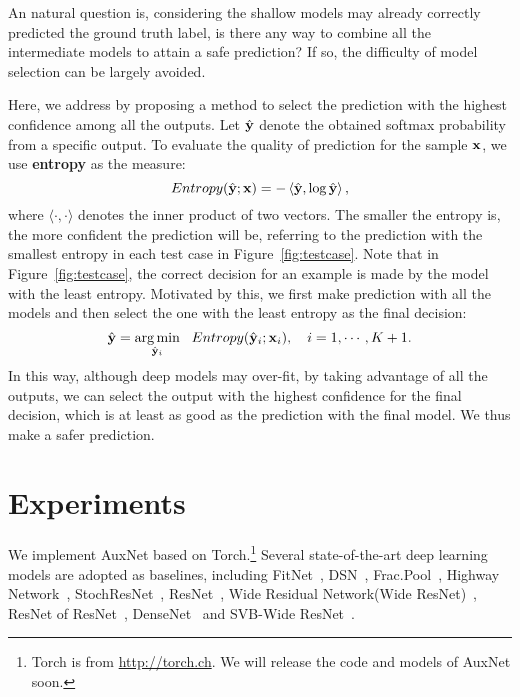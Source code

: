 \documentclass[10pt,onecolumn,letterpaper]{article}
\def\bx{{\bf x}}
\def\by{{\bf y}}
\def\SexyName{AuxNet\xspace}
\begin{document}
An natural question is, considering the shallow models may already correctly predicted the ground truth label, is there any way to combine all the intermediate models to attain a safe prediction? If so, the difficulty of model selection can be largely avoided.


Here, we address by proposing a method to select the prediction with the highest confidence among all the outputs.
Let $\hat{\by}$ denote the obtained softmax probability from a specific output.  To evaluate the quality of prediction for the sample $\bx$, we use \textbf{entropy} as the measure:
\begin{equation}
Entropy({\hat \by}; \bx) =  - \left\langle {\hat \by,\log \hat \by} \right\rangle ,
\end{equation}
where $\langle \cdot, \cdot\rangle$ denotes the inner product of two vectors. The smaller the entropy is, the more confident the prediction will be, referring to the prediction with the smallest entropy in each test case in Figure~\ref{fig:testcase}. Note that in Figure~\ref{fig:testcase}, the correct decision for an example is made by the model with the least entropy. Motivated by this, we first make prediction with all the models and then select the one with the least entropy as the final decision:
\begin{equation}
\hat \by = \mathop {\arg \min }\limits_{{\hat \by_i}} ~~Entropy({\hat \by_i};{\bx_i}), ~~~ i=1, \cdots, K+1.
\end{equation}
In this way, although deep models may over-fit, by taking advantage of all the outputs, we can select the output with the highest confidence for the final decision, which is at least as good as the prediction with the final model. We thus make a safer prediction.


\section{Experiments}\label{sec:exp}
We implement \SexyName based on Torch.\footnote{Torch is from \url{http://torch.ch}. We will release the code and models of \SexyName soon.}
Several state-of-the-art deep learning models are adopted as baselines, including FitNet~\cite{romero2014fitnets},
DSN~\cite{Lee2015}, Frac.Pool~\cite{graham2014fractional}, Highway Network~\cite{srivastava2015highway}, StochResNet~\cite{DBLP:journals/corr/HuangSLSW16}, ResNet~\cite{he2016identity}, Wide Residual Network(Wide ResNet)~\cite{zagoruyko2016wide}, ResNet of ResNet~\cite{zhang2016residual}, DenseNet~\cite{huang2016densely} and SVB-Wide ResNet~\cite{jia2016improving}.
\end{document}

